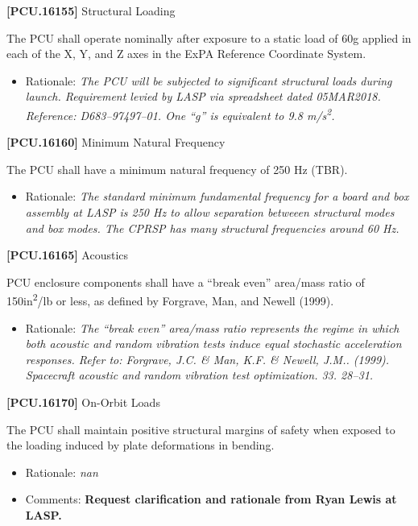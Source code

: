 \documentclass[12pt,oneside,oldfontcommands]{memoir}
\begin{document}
\textbf{[PCU.16155]} Structural Loading

The \gls{PCU} shall operate nominally after exposure to a static load of 60g applied in each of the X, Y, and Z axes in the \gls{ExPA} Reference Coordinate System.

\begin{itemize}
\item{} Rationale: \emph{The PCU will be subjected to significant structural loads during launch. Requirement levied by LASP via spreadsheet dated 05MAR2018. Reference: D683--97497--01. One ``g'' is equivalent to 9.8 m\slash s\textsuperscript{2}.}

\end{itemize}

\textbf{[PCU.16160]} Minimum Natural Frequency

The \gls{PCU} shall have a minimum natural frequency of 250 Hz (TBR\label{tbx_16}).

\begin{itemize}
\item{} Rationale: \emph{The standard minimum fundamental frequency for a board and box assembly at LASP is 250 Hz to allow separation betweeen structural modes and box modes. The CPRSP has many structural frequencies around 60 Hz.}

\end{itemize}

\textbf{[PCU.16165]} Acoustics

\gls{PCU} enclosure components shall have a ``break even'' area\slash mass ratio of 150in\textsuperscript{2}\slash lb or less, as defined by Forgrave, Man, and Newell (1999).

\begin{itemize}
\item{} Rationale: \emph{The ``break even'' area\slash mass ratio represents the regime in which both acoustic and random vibration tests induce equal stochastic acceleration responses. Refer to: Forgrave, J.C. \& Man, K.F. \& Newell, J.M.. (1999). Spacecraft acoustic and random vibration test optimization. 33. 28--31.}

\end{itemize}

\textbf{[PCU.16170]} On-Orbit Loads

The \gls{PCU} shall maintain positive structural margins of safety when exposed to the loading induced by plate deformations in bending.

\begin{itemize}
\item{} Rationale: \emph{nan}

\item{} Comments: \textbf{Request clarification and rationale from Ryan Lewis at LASP.}

\end{itemize}
\end{document}
